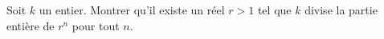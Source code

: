 Soit $k$ un entier. Montrer qu'il existe un réel $r > 1$ tel que $k$ divise la partie entière de $r^n$ pour tout $n$.
